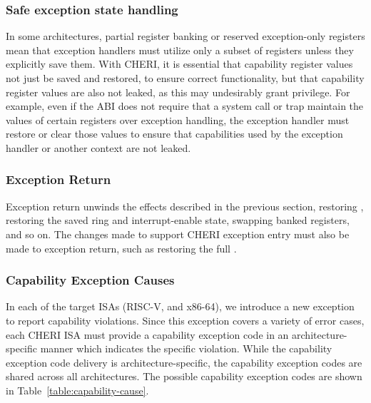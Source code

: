 \subsubsection{Safe exception state handling}

In some architectures, partial register banking or reserved exception-only
registers mean that exception handlers must utilize only a subset of
registers unless they explicitly save them.
With CHERI, it is essential that capability register values not just be saved
and restored, to ensure correct functionality, but that capability register
values are also not leaked, as this may undesirably grant privilege.
For example, even if the ABI does not require that a system call or trap
maintain the values of certain registers over exception handling, the
exception handler must restore or clear those values to ensure that
capabilities used by the exception handler or another context are not leaked.

\subsubsection{Exception Return}

Exception return unwinds the effects described in the previous section,
restoring \PC{}, restoring the saved ring and interrupt-enable
state, swapping banked registers, and so on.
The changes made to support CHERI exception entry must also be made to
exception return, such as restoring the full \PCC{}.

\subsubsection{Capability Exception Causes}
\label{sec:capability_exception_causes}

In each of the target ISAs (RISC-V, and x86-64), we introduce a new
exception to report capability violations.
Since this exception covers a variety of error cases, each CHERI ISA
must provide a capability exception code in an architecture-specific
manner which indicates the specific violation.
While the capability exception code delivery is architecture-specific,
the capability exception codes are shared across all architectures.
The possible capability exception codes are shown in Table~\ref{table:capability-cause}.

